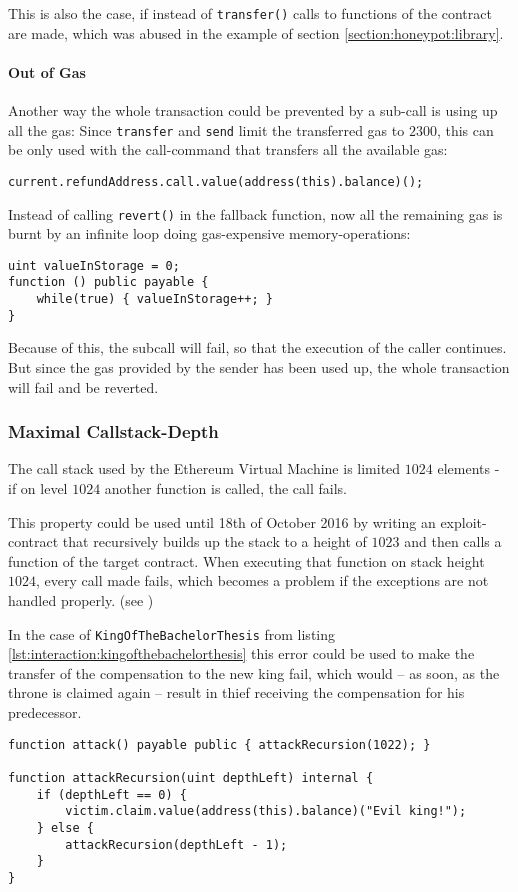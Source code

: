 This is also the case, if instead of \texttt{transfer()} calls to functions of the contract are made, which was abused in the example of section \ref{section:honeypot:library}.

\paragraph{Out of Gas}
Another way the whole transaction could be prevented by a sub-call is using up all the gas: Since \texttt{transfer} and \texttt{send} limit the transferred gas to \( 2300 \), this can be only used with the call-command that transfers all the available gas:
\begin{verbatim}
current.refundAddress.call.value(address(this).balance)();
\end{verbatim}

Instead of calling \texttt{revert()} in the fallback function, now all the remaining gas is burnt by an infinite loop doing gas-expensive memory-operations:
\begin{verbatim}
uint valueInStorage = 0;
function () public payable {
    while(true) { valueInStorage++; }
}
\end{verbatim}

Because of this, the subcall will fail, so that the execution of the caller continues. But since the gas provided by the sender has been used up, the whole transaction will fail and be reverted.

\subsubsection{Maximal Callstack-Depth}
The call stack used by the Ethereum Virtual Machine is limited \( 1024 \) elements - if on level \(1024 \) another function is called, the call fails.

This property could be used until 18th of October 2016 by writing an exploit-contract that recursively builds up the stack to a height of \( 1023 \) and then calls a function of the target contract. When executing that function on stack height \( 1024 \), every call made fails, which becomes a problem if the exceptions are not handled properly. (see \cite[Page 11 (Stack Size Limit)]{atzei:attacksurvey})

In the case of \texttt{KingOfTheBachelorThesis} from listing \ref{lst:interaction:kingofthebachelorthesis} this error could be used to make the transfer of the compensation to the new king fail, which would -- as soon, as the throne is claimed again -- result in thief receiving the compensation for his predecessor.
\begin{verbatim}
function attack() payable public { attackRecursion(1022); }

function attackRecursion(uint depthLeft) internal {
    if (depthLeft == 0) {
        victim.claim.value(address(this).balance)("Evil king!");
    } else {
        attackRecursion(depthLeft - 1);
    }
}
\end{verbatim}

